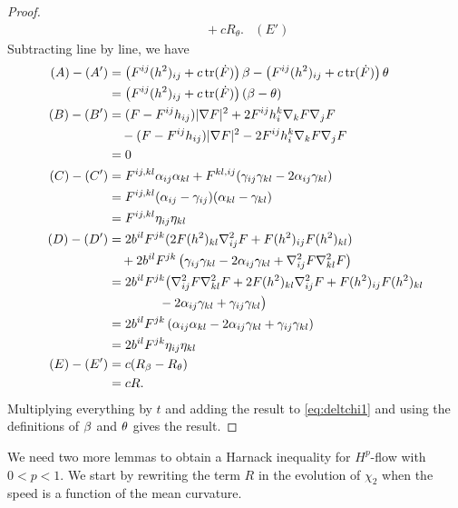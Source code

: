 \documentclass{amsart}
\begin{document}
\begin{proof}
\begin{align*}
&\quad + cR_{\theta}. & (E')
\end{align*}
Subtracting line by line, we have
\begin{align*}
(A) - (A') &= \left(F^{ij}(h^2)_{ij} + c\operatorname{tr}(\dot{F}) \right)\beta - \left(F^{ij}(h^2)_{ij} + c\operatorname{tr}(\dot{F}) \right)\theta \\
        &= \left(F^{ij}(h^2)_{ij} + c\operatorname{tr}(\dot{F}) \right)(\beta - \theta) \\
(B) - (B') &= (F - F^{ij}h_{ij}) |\nabla F|^{2} + 2F^{ij}h^{k}_{i}\nabla_k F \nabla_j F \\
    &\quad - (F - F^{ij}h_{ij})|\nabla F|^{2} - 2F^{ij}h^{k}_{i}\nabla_kF\nabla_jF \\
        &= 0 \\
(C) - (C') &= F^{ij,kl} \alpha_{ij} \alpha_{kl} + F^{kl,ij} (\gamma_{ij}\gamma_{kl}  - 2\alpha_{ij} \gamma_{kl})\\
    &= F^{ij,kl} (\alpha_{ij} - \gamma_{ij}) (\alpha_{kl} - \gamma_{kl}) \\
&= F^{ij,kl} \eta_{ij} \eta_{kl} \\
(D) - (D') &= 2b^{il}F^{jk} (2F(h^2)_{kl}\nabla^2_{ij}F + F(h^2)_{ij}F(h^2)_{kl}) \\
&\quad + 2b^{il} F^{jk} \left(\gamma_{ij} \gamma_{kl} - 2\alpha_{ij} \gamma_{kl} + \nabla^2_{ij}F\nabla^2_{kl}F\right) \\
&= 2b^{il}F^{jk} \big(\nabla^2_{ij}F\nabla^2_{kl}F +2F(h^2)_{kl}\nabla^2_{ij}F + F(h^2)_{ij}F(h^2)_{kl} \\
    &\qquad\qquad - 2 \alpha_{ij} \gamma_{kl} + \gamma_{ij} \gamma_{kl} \big) \\
&= 2b^{il}F^{jk} \left(\alpha_{ij}\alpha_{kl} - 2 \alpha_{ij} \gamma_{kl} + \gamma_{ij} \gamma_{kl} \right) \\
    &= 2b^{il}F^{jk} \eta_{ij} \eta_{kl} \\
(E) - (E') &= c(R_{\beta} - R_{\theta}) \\
    &= cR.\\
\end{align*}
Multiplying everything by \(t\) and adding the result to \eqref{eq:deltchi1} and using the definitions of $\beta$ and $\theta$ gives the result.
\end{proof}
We need two more lemmas to obtain a Harnack inequality for $H^{p}$-flow with $0<p<1.$  We start by rewriting the term $R$ in the evolution of \(\chi_2\) when the speed is a function of the mean curvature.
\end{document}

